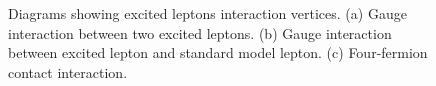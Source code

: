 \begin{figure}
    \centering
    \\
    \\
    \caption{Diagrams showing excited leptons interaction vertices. (a) Gauge interaction between two excited leptons. (b) Gauge interaction between excited lepton and standard model lepton. (c) Four-fermion contact interaction.}
    \label{fig:ExLep_vtxs}
\end{figure}

